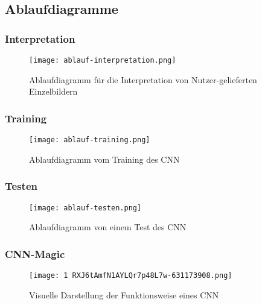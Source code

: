 \subsection{Ablaufdiagramme}
\label{sec:AnalyseAblaufdiagramme}

\subsubsection{Interpretation}
\label{sec:AnalyseInterpretation}
\begin{figure}[H]
\centering
\texttt{[image: ablauf-interpretation.png]}
\caption{Ablaufdiagramm für die Interpretation von Nutzer-gelieferten Einzelbildern}
\label{fig:analyseablauf-interpretation}
\end{figure}


\subsubsection{Training}
\label{sec:AnalyseTraining}
\begin{figure}[H]
\centering
\texttt{[image: ablauf-training.png]}
\caption{Ablaufdiagramm vom Training des CNN}
\label{fig:analyseablauf-training}
\end{figure}


\subsubsection{Testen}
\label{sec:AnalyseTesten}
\begin{figure}[H]
\centering
\texttt{[image: ablauf-testen.png]}
\caption{Ablaufdiagramm von einem Test des CNN}
\label{fig:analyseablauf-testen}
\end{figure}


\subsubsection{CNN-Magic}
\label{sec:AnalyseCNN-Magic}
\begin{figure}[H]
\centering
\texttt{[image: 1 RXJ6tAmfN1AYLQr7p48L7w-631173908.png]}
\caption{Visuelle Darstellung der Funktionsweise eines CNN}
\label{fig:analyse1RXJ6tAmfN1AYLQr7p48L7w-631173908}
\end{figure}

